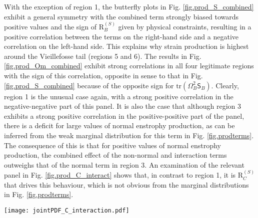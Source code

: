 \documentclass[preprint,amssymb,amsmath,aip,cha]{revtex4-1}
\begin{document}
With the exception of region 1, the butterfly plots in Fig. \ref{fig.prod_S_combined} exhibit a general symmetry with the combined term strongly biased towards positive values and the sign of $\mbox{R}_{B}^{(S)}$ given by physical constraints, resulting in a positive correlation between the terms on the right-hand side and a negative correlation on the left-hand side. This explains why strain production is highest around the Vieillefosse tail (regions 5 and 6). The results in Fig. \ref{fig.prod_Om_combined} exhibit strong correlations in all four legitimate regions with the sign of this correlation, opposite in sense to that in Fig. \ref{fig.prod_S_combined} because of the opposite sign for $\mbox{tr}(\mathsf{\Omega}^{2}_{B}\mathsf{S}_{B})$. Clearly, region 1 is the unusual case again, with a strong positive correlation in the negative-negative part of this panel. It is also the case that although region 3 exhibits a strong positive correlation in the positive-positive part of the panel, there is a deficit for large values of normal enstrophy production, as can be inferred from the weak marginal distribution for this term in Fig. \ref{fig.prodterms}. The consequence of this is that for positive values of normal enstrophy production, the combined effect of the non-normal and interaction terms outweighs that of the normal term in region 3. An examination of the relevant panel in Fig. \ref{fig.prod_C_interact} shows that, in contrast to region 1, it is $\mbox{R}_{C}^{(S)}$ that drives this behaviour, which is not obvious from the marginal distributions in Fig. \ref{fig.prodterms}.

\begin{figure*}
  \texttt{[image: jointPDF\_C\_interaction.pdf]}
\caption{Joint probability distributions (on $\mbox{log}_{10}$ axes) for $\mbox{R}_{C}^{(S)}$ and $\mbox{tr}(\mathsf{\Omega}^{2}_{C}\mathsf{S}_{B})$ conditioned on the region of the $Q_{A}-R_{A}$ diagram, and written as the difference between the distribution in this region and the overall distributions function. Positive values indicate an excess for this region and have the lighter probability contours. Contours are at: $\{\pm 1.0 \times 10^{-4}, \pm 2.0 \times 10^{-4}, \pm 4.0 \times 10^{-4}, \pm 8.0 \times 10^{-4}\}$. The text boxes summarize the net effect of the two terms (seen in Fig. \ref{fig.prod_S_combined} and \ref{fig.prod_Om_combined}) and the term(s) that drive this overall pattern.}
\label{fig.prod_C_interact}       %
\end{figure*}
\end{document}
